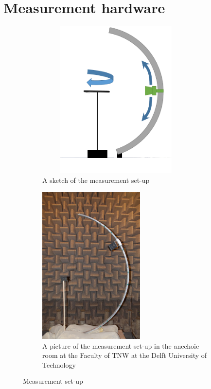 \section{Measurement hardware}
\begin{figure}[b!]
        \centering
        \begin{subfigure}[t]{0.4\textwidth}
                \centering
    			\includegraphics[height=8cm, width=8cm,keepaspectratio]{afbeeldingen/opstelling_pptx.png}
			    \caption{A sketch of the measurement set-up}
			    \label{fig:opstelling_pptx}
        \end{subfigure}%
        \quad %
        \begin{subfigure}[t]{0.5\textwidth}
                \centering
    			\includegraphics[height=8cm]{cover/onzecover.jpg}
			    \caption{A picture of the measurement set-up in the anechoic room at the Faculty of TNW at the Delft University of Technology}
			    \label{fig:opstelling_foto}
        \end{subfigure}
        \caption{Measurement set-up}
        \label{fig:opstelling_beide}
\end{figure}

